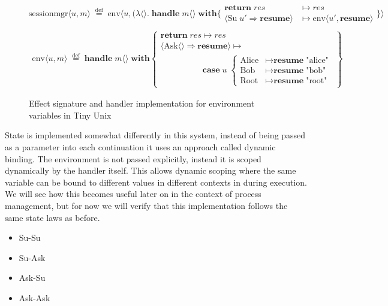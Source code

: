 \documentclass[logo,bsc,singlespacing,parskip]{infthesis}
\begin{document}
\begin{figure}[H]
\centering

\[
 \text{sessionmgr} \langle \mathit{u}, m \rangle \;\overset{\mathrm{def}}{=} \;
 \text{env} \langle \mathit{u}, (\lambda \langle \rangle.\; \textbf{handle}\; m \langle \rangle\; \textbf{with}  \{ 
 \begin{array}{ll}
   \textbf{return}\; res & \mapsto res \\
   \!\langle \text{Su}\; \mathit{u'} \Rightarrow \textbf{resume} \!\rangle & \mapsto \text{env} \langle \mathit{u'}, \textbf{resume} \rangle
 \end{array}
 \} \rangle 
 \]
\[
\begin{array}{l}
\\
\text{env} \langle \mathit{u}, m \rangle \;\overset{\mathrm{def}}{=} \;
\textbf{handle}\; m \langle \rangle\; \textbf{with} \left\{
\begin{array}{ll}
\textbf{return}\; res  \mapsto res \\
\langle \text{Ask} \langle \rangle \Rightarrow \textbf{resume} \rangle  \mapsto \\
\quad\quad\quad\quad\quad\textbf{case}\; \mathit{u}\; \left\{
\begin{array}{ll}
\text{Alice} & \mapsto \textbf{resume}\; \text{"alice"} \\
\text{Bob} & \mapsto \textbf{resume}\; \text{"bob"} \\
\text{Root} & \mapsto \textbf{resume}\; \text{"root"}
\end{array}
\right.
\end{array}
\right\}
\end{array}
\]
\caption{Effect signature and handler implementation for environment variables in Tiny Unix}
\label{fig:env-state-handler}
\end{figure}

State is implemented somewhat differently in this system, instead of being passed as a parameter into each continuation it uses an approach called dynamic binding. The environment is not passed explicitly, instead it is scoped dynamically by the handler itself. This allows dynamic scoping where the same variable can be bound to different values in different contexts in during execution. We will see how this becomes useful later on in the context of process management, but for now we will verify that this implementation follows the same state laws as before.

\begin{itemize}
    \item Su-Su
    \item Su-Ask
    \item Ask-Su
    \item Ask-Ask
\end{itemize}
    
\end{document}
